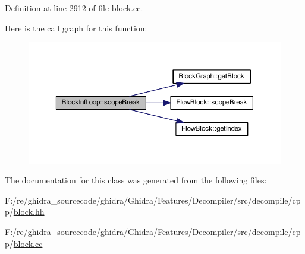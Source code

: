 Definition at line 2912 of file block.\+cc.

Here is the call graph for this function\+:
\nopagebreak
\begin{figure}[H]
\begin{center}
\leavevmode
\includegraphics[width=350pt]{class_block_inf_loop_ad1f92e4b37d7bf19cc409d353ad281ae_cgraph}
\end{center}
\end{figure}


The documentation for this class was generated from the following files\+:\begin{DoxyCompactItemize}
\item 
F\+:/re/ghidra\+\_\+sourcecode/ghidra/\+Ghidra/\+Features/\+Decompiler/src/decompile/cpp/\mbox{\hyperlink{block_8hh}{block.\+hh}}\item 
F\+:/re/ghidra\+\_\+sourcecode/ghidra/\+Ghidra/\+Features/\+Decompiler/src/decompile/cpp/\mbox{\hyperlink{block_8cc}{block.\+cc}}\end{DoxyCompactItemize}
